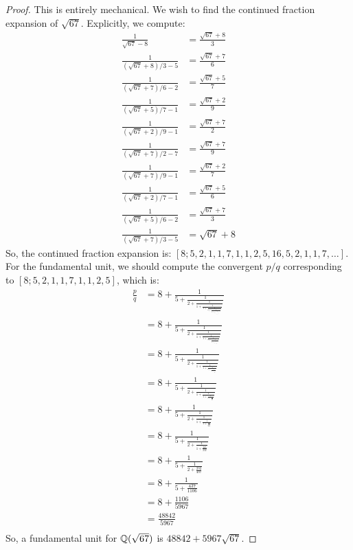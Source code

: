 \begin{proof}
	This is entirely mechanical. We wish to find the continued fraction expansion of $\sqrt{67}$. Explicitly, we compute:
	\begin{align*}
		\frac{1}{\sqrt{67}-8} &= \frac{\sqrt{67}+8}{3} \\
		\frac{1}{(\sqrt{67}+8)/3-5} &= \frac{\sqrt{67}+7}{6} \\
		\frac{1}{(\sqrt{67}+7)/6-2} &= \frac{\sqrt{67}+5}{7} \\
		\frac{1}{(\sqrt{67}+5)/7-1} &= \frac{\sqrt{67}+2}{9} \\
		\frac{1}{(\sqrt{67}+2)/9-1} &= \frac{\sqrt{67}+7}{2} \\
		\frac{1}{(\sqrt{67}+7)/2-7} &= \frac{\sqrt{67}+7}{9} \\
		\frac{1}{(\sqrt{67}+7)/9-1} &= \frac{\sqrt{67}+2}{7} \\
		\frac{1}{(\sqrt{67}+2)/7-1} &= \frac{\sqrt{67}+5}{6} \\
		\frac{1}{(\sqrt{67}+5)/6-2} &= \frac{\sqrt{67}+7}{3} \\
		\frac{1}{(\sqrt{67}+7)/3-5} &= \sqrt{67}+8
	\end{align*}
	So, the continued fraction expansion is: $[8; 5, 2, 1, 1, 7, 1, 1, 2, 5, 16, 5, 2, 1, 1, 7, \ldots]$. For the fundamental unit, we should compute the convergent $p/q$ corresponding to $[8; 5, 2, 1, 1, 7, 1, 1, 2, 5]$, which is:
	\begin{align*}
	\frac{p}{q}
		&= 8+\frac{1}{5+\frac{1}{2+\frac{1}{1+\frac{1}{1+\frac{1}{7+\frac{1}{1+\frac{1}{1+\frac{1}{2+\frac{1}{5}}}}}}}}} \\
		&= 8+\frac{1}{5+\frac{1}{2+\frac{1}{1+\frac{1}{1+\frac{1}{7+\frac{1}{1+\frac{1}{1+\frac{5}{11}}}}}}}} \\
		&= 8+\frac{1}{5+\frac{1}{2+\frac{1}{1+\frac{1}{1+\frac{1}{7+\frac{1}{1+\frac{11}{16}}}}}}} \\
		&= 8+\frac{1}{5+\frac{1}{2+\frac{1}{1+\frac{1}{1+\frac{1}{7+\frac{16}{27}}}}}} \\
		&= 8+\frac{1}{5+\frac{1}{2+\frac{1}{1+\frac{1}{1+\frac{27}{205}}}}} \\
		&= 8+\frac{1}{5+\frac{1}{2+\frac{1}{1+\frac{205}{232}}}} \\
		&= 8+\frac{1}{5+\frac{1}{2+\frac{232}{437}}} \\
		&= 8+\frac{1}{5+\frac{437}{1106}} \\
		&= 8+\frac{1106}{5967} \\
		&= \frac{48842}{5967} \\
	\end{align*}
	So, a fundamental unit for $\mathbb{Q}(\sqrt{67})$ is $48842+5967\sqrt{67}$.
\end{proof}
